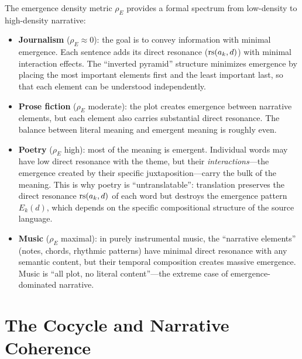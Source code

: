 \begin{remark}
\label{rem:density-spectrum}
The emergence density metric $\rho_E$ provides a formal spectrum from
low-density to high-density narrative:

\begin{itemize}
  \item \textbf{Journalism} ($\rho_E \approx 0$): the goal is to convey
        information with minimal emergence.  Each sentence adds its direct
        resonance ($\mathrm{rs}(a_k, d)$) with minimal interaction effects.  The
        ``inverted pyramid'' structure minimizes emergence by placing the most
        important elements first and the least important last, so that each
        element can be understood independently.

  \item \textbf{Prose fiction} ($\rho_E$ moderate): the plot creates
        emergence between narrative elements, but each element also carries
        substantial direct resonance.  The balance between literal meaning
        and emergent meaning is roughly even.

  \item \textbf{Poetry} ($\rho_E$ high): most of the meaning is emergent.
        Individual words may have low direct resonance with the theme, but
        their \emph{interactions}---the emergence created by their specific
        juxtaposition---carry the bulk of the meaning.  This is why poetry
        is ``untranslatable'': translation preserves the direct resonance
        $\mathrm{rs}(a_k, d)$ of each word but destroys the emergence pattern
        $E_k(d)$, which depends on the specific compositional structure
        of the source language.

  \item \textbf{Music} ($\rho_E$ maximal): in purely instrumental music,
        the ``narrative elements'' (notes, chords, rhythmic patterns) have
        minimal direct resonance with any semantic content, but their
        temporal composition creates massive emergence.  Music is
        ``all plot, no literal content''---the extreme case of emergence-
        dominated narrative.
\end{itemize}
\end{remark}


\section{The Cocycle and Narrative Coherence}

